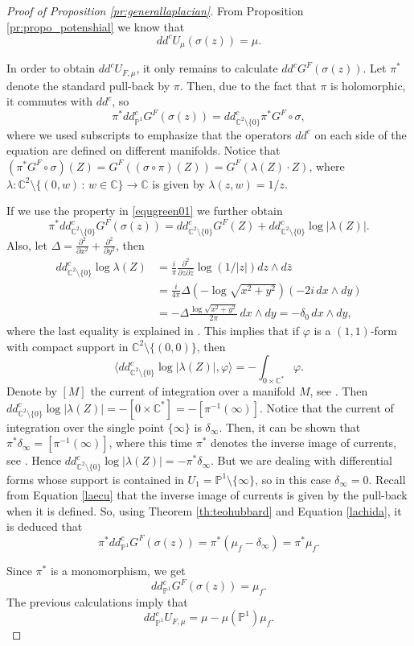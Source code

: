 \begin{proof}[Proof of Proposition \ref{pr:generallaplacian}]
From Proposition \ref{pr:propo_potenshial} we know that
$$dd^c U_{\mu}(\sigma (z)) = \mu.$$

In order to obtain $dd^c U_{F,\mu}$, it only remains to calculate $dd^c G^F(\sigma(z))$. Let $\pi^*$ denote the standard pull-back by $\pi$. Then, due to the fact that $\pi$ is holomorphic, it commutes with $dd^c$, so
$$\pi^* dd^c_{\mathbb{P}^1} G^F(\sigma(z)) = dd^c_{\mathbb{C}^2\setminus\{0\}} \pi^*G^F\circ \sigma,$$
where we used subscripts to emphasize that the operators $dd^c$ on each side of the equation are defined on different manifolds. Notice that $(\pi^* G^F\circ \sigma)(Z) = G^F((\sigma\circ \pi)(Z)) = G^F(\lambda(Z)\cdot Z)$, where $\lambda:\mathbb{C}^2\setminus\{(0,w)\,:\,w\in \mathbb{C}\} \rightarrow \mathbb{C}$ is given by $\lambda(z,w)=1/z$.

If we use the property in \eqref{equgreen01} we further obtain
\begin{equation}\label{lachida}
\pi^* dd^c_{\mathbb{C}^2\setminus\{0\}} G^F(\sigma(z)) = dd^c_{\mathbb{C}^2\setminus\{0\}} G^F(Z) + dd^c_{\mathbb{C}^2\setminus\{0\}} \log|\lambda(Z)|.
\end{equation}
Also, let $\Delta = \frac{\partial^2}{\partial x^2}+\frac{\partial^2}{\partial y^2}$, then
\begin{align*}
dd^c_{\mathbb{C}^2\setminus\{0\}}\log \lambda(Z) &= \frac{i}{\pi} \frac{\partial^2}{\partial z\partial \bar z} \log(1/|z|) dz\wedge d\bar z\\
&= \frac{i}{4\pi}\Delta(-\log\sqrt{x^2+y^2})(-2i\,dx\wedge dy)\\
&= -\Delta \frac{\log\sqrt{x^2+y^2}}{2\pi}\, dx\wedge dy = -\delta_0\, dx\wedge dy,
\end{align*}
where the last equality is explained in \cite[Section 3.D.]{demailly}. This implies that if $\varphi$ is a $(1,1)$-form with compact support in $\mathbb{C}^2\setminus\{(0,0)\}$, then
$$\langle dd^c_{\mathbb{C}^2\setminus\{0\}} \log|\lambda(Z)| , \varphi \rangle = -\int_{0\times \mathbb{C}^*} \varphi.$$
Denote by $[M]$ the current of integration over a manifold $M$, see \cite[Example 2.4]{demailly}. Then $dd^c_{\mathbb{C}^2\setminus\{0\}} \log|\lambda(Z)| = -[0\times \mathbb{C}^*]=-[\pi^{-1}(\infty)]$. Notice that the current of integration over the single point $\{\infty\}$ is $\delta_\infty$. Then, it can be shown that $\pi^*\delta_\infty = [\pi^{-1}(\infty)]$, where this time $\pi^*$ denotes the inverse image of currents, see \cite[Section 2.C.2.]{demailly}. Hence $dd^c_{\mathbb{C}^2\setminus\{0\}} \log|\lambda(Z)| = -\pi^*\delta_\infty$. But we are dealing with differential forms whose support is contained in $U_1=\mathbb{P}^1\setminus\{\infty\}$, so in this case $\delta_\infty= 0$. Recall from Equation \eqref{laecu} that the inverse image of currents is given by the pull-back when it is defined. So, using Theorem \ref{th:teohubbard} and Equation \eqref{lachida}, it is deduced that
$$\pi^* dd^c_{\mathbb{P}^1} G^F(\sigma(z)) = \pi^* (\mu_f-\delta_\infty)=\pi^*\mu_f.$$

Since $\pi^*$ is a monomorphism, we get
$$dd^c_{\mathbb{P}^1} G^F(\sigma(z)) = \mu_f.$$
The previous calculations imply that
$$dd^c_{\mathbb{P}^1} U_{F,\mu} = \mu -\mu(\mathbb{P}^1)\mu_f.$$

\end{proof}

